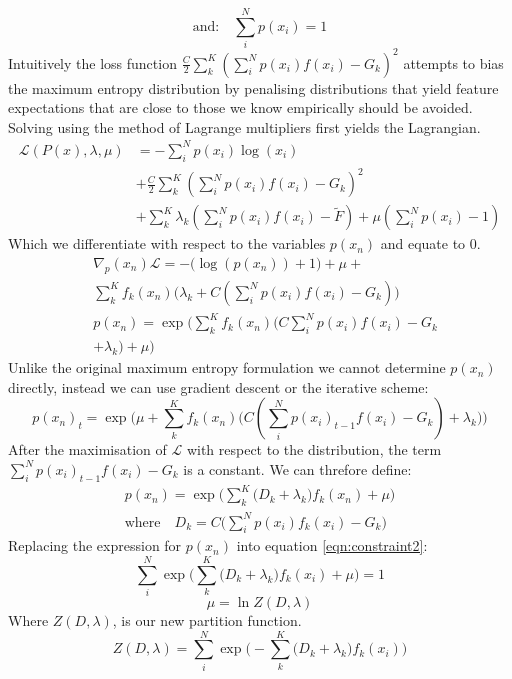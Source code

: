 \documentclass[letterpaper]{article}
\begin{document}
	\begin{equation}
	\text{and:} \quad \sum_i^N p(x_i) = 1
	\end{equation}
	Intuitively the loss function $\frac{C}{2}\sum_k^K(\sum_i^N p(x_i)f(x_i) - G_k)^2$ attempts to bias the 
	maximum entropy distribution by penalising distributions that yield feature expectations that are close 
	to those we know empirically should be avoided.\\
	Solving using the method of Lagrange multipliers first yields the Lagrangian.
\begin{equation}
	\begin{split}
	\mathcal{L}(P(x),\lambda,\mu) &=  -\sum_i^N p(x_i)\log(x_i) \\
	&+\frac{C}{2}\sum_k^K(\sum_i^N p(x_i)f(x_i) - G_k)^2\\
	 & + \sum_k^K\lambda_k(\sum_i^N p(x_i)f(x_i) - \widetilde{F}) + \mu(\sum_i^N p(x_i) - 1)
	\end{split}
\end{equation}
Which we differentiate with respect to the variables $p(x_n)$ and equate to 0.
\begin{equation}
	\begin{split}
	&\nabla_p(x_n)\mathcal{L} =  -\big(\log(p(x_n))+1\big) +\mu + \\
	&\sum_k^K f_k(x_n)\big(\lambda_k+C(\sum_i^N p(x_i)f(x_i) - G_k)\big)\\
	&p(x_n) =\exp \Big( \sum_k^Kf_k(x_n)\big(C\sum_i^N p(x_i)f(x_i) - G_k\\
	&+\lambda_k\big) + \mu \Big)
	\end{split}
\end{equation}
Unlike the original maximum entropy formulation we cannot determine $p(x_n)$ directly, instead 
we can use gradient descent or the iterative scheme:
\begin{equation}
p(x_n)_t =\exp \Big(\mu+ \sum_k^Kf_k(x_n)\big( C(\sum_i^N p(x_i)_{t-1}f(x_i) - G_k)+\lambda_k\big)\Big) \label{eqn:iter_scheme}
\end{equation}
After the maximisation of $\mathcal{L}$ with respect to the distribution, the term $\sum_i^N p(x_i)_{t-1}f(x_i) - G_k$ is a constant.
We can threfore define:
\begin{equation}
	\begin{split}
	p(x_n) =\exp \Big( \sum_k^K\big(D_k+\lambda_k\big)f_k(x_n) + \mu \Big)\\
	\text{where} \quad D_k = C\big(\sum_i^N p(x_i)f_k(x_i) - G_k\big)
	\end{split}
\end{equation}
Replacing the expression for $p(x_n)$ into equation \ref{eqn:constraint2}:
\begin{equation}
	\sum_i^N \exp \Big( \sum_k^K\big(D_k+\lambda_k\big)f_k(x_i) + \mu \Big) = 1
\end{equation}
\begin{equation}
	\mu = \ln Z(D,\lambda)
\end{equation}
Where $Z(D,\lambda)$, is our new partition function.
\begin{equation}
	Z(D,\lambda) = \sum_i^N \exp \Big( -\sum_k^K\big(D_k+\lambda_k\big)f_k(x_i) \Big) 
\end{equation}
\end{document}
